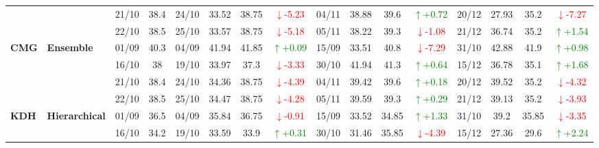 \documentclass{ieeeaccess}
\begin{document}
{\begin{longtable}{llcc|cccc|cccc|cccc}
& 
& 21/10 & 38.4 & 24/10 & 33.52 & 38.75 & \textcolor{red}{\(\downarrow\)-5.23} & 04/11 & 38.88 & 39.6 & \textcolor{green}{\(\uparrow\)+0.72} & 20/12 & 27.93 & 35.2 & \textcolor{red}{\(\downarrow\)-7.27} \\

&
& 22/10 & 38.5 & 25/10 & 33.57 & 38.75 & \textcolor{red}{\(\downarrow\)-5.18} & 05/11 & 38.22 & 39.3 & \textcolor{red}{\(\downarrow\)-1.08} & 21/12 & 36.74 & 35.2 & \textcolor{green}{\(\uparrow\)+1.54} \\
\midrule


\multirow{4}{*}{\textbf{CMG}} 
& \textbf{Ensemble}
& 01/09 & 40.3 & 04/09 & 41.94 & 41.85 & \textcolor{green}{\(\uparrow\)+0.09} & 15/09 & 33.51 & 40.8 & \textcolor{red}{\(\downarrow\)-7.29} & 31/10 & 42.88 & 41.9 & \textcolor{green}{\(\uparrow\)+0.98} \\

& 
& 16/10 & 38 & 19/10 & 33.97 & 37.3 & \textcolor{red}{\(\downarrow\)-3.33} & 30/10 & 41.94 & 41.3 & \textcolor{green}{\(\uparrow\)+0.64} & 15/12 & 36.78 & 35.1 & \textcolor{green}{\(\uparrow\)+1.68} \\

& 
& 21/10 & 38.4 & 24/10 & 34.36 & 38.75 & \textcolor{red}{\(\downarrow\)-4.39} & 04/11 & 39.42 & 39.6 & \textcolor{green}{\(\uparrow\)+0.18} & 20/12 & 39.52 & 35.2 & \textcolor{red}{\(\downarrow\)-4.32} \\

&
& 22/10 & 38.5 & 25/10 & 34.47 & 38.75 & \textcolor{red}{\(\downarrow\)-4.28} & 05/11 & 39.59 & 39.3 & \textcolor{green}{\(\uparrow\)+0.29} & 21/12 & 39.13 & 35.2 & \textcolor{red}{\(\downarrow\)-3.93} \\
\midrule



\multirow{4}{*}{\textbf{KDH}} 
& \textbf{Hierarchical}
& 01/09 & 36.5 & 04/09 & 35.84 & 36.75 & \textcolor{red}{\(\downarrow\)-0.91} & 15/09 & 33.52 & 34.85 & \textcolor{green}{\(\uparrow\)+1.33} & 31/10 & 39.2 & 35.85 & \textcolor{red}{\(\downarrow\)-3.35} \\

&
& 16/10 & 34.2 & 19/10 & 33.59 & 33.9 & \textcolor{green}{\(\uparrow\)+0.31} & 30/10 & 31.46 & 35.85 & \textcolor{red}{\(\downarrow\)-4.39} & 15/12 & 27.36 & 29.6 & \textcolor{green}{\(\uparrow\)+2.24} \\


\end{longtable}}
\end{document}
